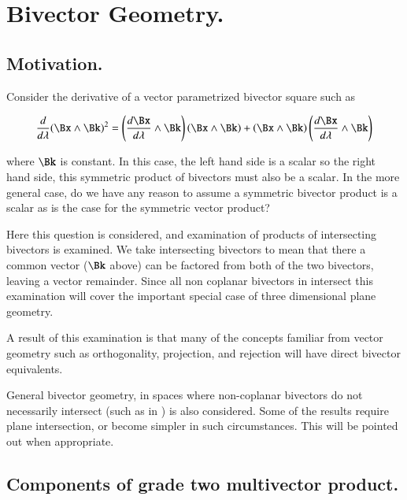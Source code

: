 %

\chapter{Bivector Geometry.}
\label{chap:bivector}
{}

\beginArtWithToc

\section{Motivation. }

Consider the derivative of a vector parametrized bivector square such as

\begin{align*}
\frac{d}{d\lambda} {(\Bx \wedge \Bk)^2} = 
\left(\frac{d\Bx}{d\lambda} \wedge \Bk\right) \left(\Bx \wedge \Bk\right)
+\left(\Bx \wedge \Bk\right) \left(\frac{d \Bx}{d\lambda} \wedge \Bk\right)
\end{align*}

where $\Bk$ is constant.  In this case, the left hand side is a scalar so the right hand side, this symmetric product of bivectors must also be a scalar.  In the more general case, do we have any reason to assume a symmetric bivector product is a scalar as is the case for the symmetric vector product?

Here this question is considered, and examination of products of intersecting bivectors is examined.  We take intersecting bivectors to mean that there a common vector ($\Bk$ above) can be factored from both of the two bivectors, leaving a vector remainder.  Since all non coplanar bivectors in  intersect this examination will cover the important special case of three dimensional plane geometry.

A result of this examination is that many of the concepts familiar from vector geometry such as orthogonality, projection, and rejection will have direct bivector equivalents.

General bivector geometry, in spaces where non-coplanar bivectors do not necessarily intersect (such as in ) is also considered.  Some of the results require plane intersection, or become simpler in such circumstances.  This will be pointed out when appropriate.

\section{Components of grade two multivector product.}

